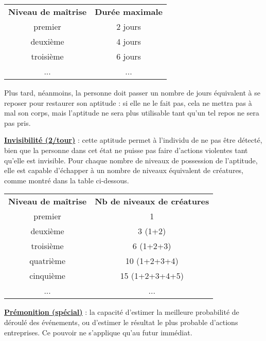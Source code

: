\bigskip

\begin{tabular}{cc}
\textbf{Niveau de maîtrise} & \textbf{Durée maximale} \\
premier     & 2 jours \\
deuxième    & 4 jours \\
troisième   & 6 jours \\
...         & ... \\
\end{tabular}

\bigskip

Plus tard, néanmoins, la personne doit passer un nombre de jours équivalent à se reposer pour restaurer son aptitude : si elle ne le fait pas, cela ne mettra pas à mal son corps, mais l'aptitude ne sera plus utilisable tant qu'un tel repos ne sera pas pris.

\bigskip


\label{guerrier-invisibilite}\textbf{\uline{Invisibilité (2/tour)}} : cette aptitude permet à l'individu de ne pas être détecté, bien que la personne dans cet état ne puisse pas faire d'actions violentes tant qu'elle est invisible. Pour chaque nombre de niveaux de possession de l'aptitude, elle est capable d'échapper à un nombre de niveaux équivalent de créatures, comme montré dans la table ci-dessous.

\bigskip

\begin{tabular}{cc}
\textbf{Niveau de maîtrise} & \textbf{Nb de niveaux de créatures} \\
premier     & 1 \\
deuxième    & 3 (1+2) \\
troisième   & 6 (1+2+3) \\
quatrième   & 10 (1+2+3+4) \\
cinquième   & 15 (1+2+3+4+5) \\
...         & ... \\
\end{tabular}

\bigskip

\label{guerrier-premonition}\textbf{\uline{Prémonition (spécial)}} : la capacité d'estimer la meilleure probabilité de déroulé des événements, ou d'estimer le résultat le plus probable d'actions entreprises. Ce pouvoir ne s'applique qu'au futur immédiat.

